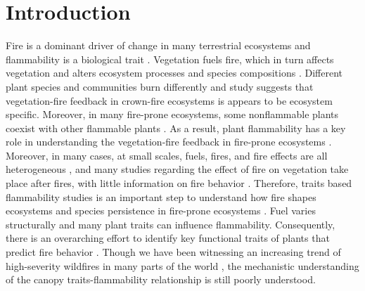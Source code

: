 \documentclass[12pt]{report}
\begin{document}
\section{Introduction}

Fire is a dominant driver of change in many terrestrial ecosystems and flammability is a biological trait \citep{pausas2012flammability}. Vegetation fuels fire, which in turn affects vegetation \citep{bar2019fire} and alters ecosystem processes \citep{debano1978effect, debano1998fire, grogan2000fire,wan2001fire, keane2008ecological, roces2022global,ojima1994long} and species compositions \citep{cochrane2003fire,cleary2004changes, laurance2003slow}. Different plant species and communities burn differently and study \citep{pausas2004plant} suggests that vegetation-fire feedback in crown-fire ecosystems is appears to be ecosystem specific. Moreover, in many fire-prone ecosystems, some nonflammable plants coexist with other flammable plants \citep{pausas2012fire, pausas2017flammability}. As a result, plant flammability has a key role in understanding the vegetation-fire feedback in fire-prone ecosystems \citep{pausas2012fire, pausas2017flammability}. Moreover, in many cases, at small scales, fuels, fires, and fire effects are all heterogeneous \citep{gagnon2010does}, and many studies regarding the effect of fire on vegetation take place after fires, with little information on fire behavior \citep{o2018advances}. Therefore, traits based flammability studies is an important step to understand how fire shapes ecosystems and species persistence in fire-prone ecosystems \citep{pausas2012fire, pausas2017flammability}. Fuel varies structurally and many plant traits can influence flammability. Consequently, there is an overarching effort to identify key functional traits of plants that predict fire behavior \citep{schwilk2011scaling}. Though we have been witnessing an increasing trend of high-severity wildfires in many parts of the world \citep{miller2012trends, dennison2014large, weber2020spatiotemporal, salguero2020wildfire}, the mechanistic understanding of the canopy traits-flammability relationship is still  poorly understood.\\
\end{document}
